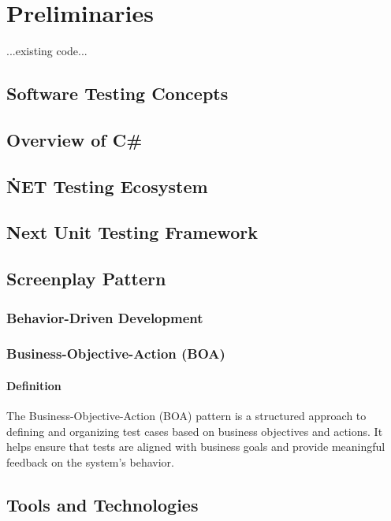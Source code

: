 \chapter{Preliminaries\label{chap:preliminaries}}

...existing code...

\section{Software Testing Concepts}


\section{Overview of C\#}


\section{\.NET Testing Ecosystem}


\section{Next Unit Testing Framework}


\section{Screenplay Pattern}


\subsection{Behavior-Driven Development}


\subsection{Business-Objective-Action (BOA)}
\subsubsection{Definition}
The Business-Objective-Action (BOA) pattern is a structured approach to defining and organizing test cases based on business objectives and actions. It helps ensure that tests are aligned with business goals and provide meaningful feedback on the system's behavior.



\section{Tools and Technologies}